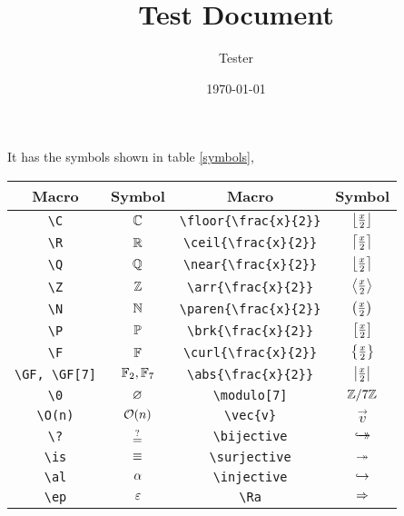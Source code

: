 \documentclass{article}
\title{Test Document}
\author{Tester}
\date{\today}
\newcommand{\bk}{\textbackslash}
\newcommand{\dummy}[1]{\texttt{\bk #1\{\bk frac\{x\}\{2\}\}}}
\begin{document}
 \maketitle
It has the symbols shown in table \ref{symbols},
\begin{table}[hbtp]%
  \centering%
  \begin{tabular}{||c | c | c | c ||} \hline
    Macro                      & Symbol       & Macro                               & Symbol                \\ \hline
    \texttt{\bk C}             & $\C$         & \dummy{floor}                       & $\floor{\frac{x}{2}}$ \\ \hline
    \texttt{\bk R}             & $\R$         & \dummy{ceil}                        & $\ceil{\frac{x}{2}}$  \\ \hline
    \texttt{\bk Q}             & $\Q$         & \dummy{near}                        & $\near{\frac{x}{2}}$  \\ \hline
    \texttt{\bk Z}             & $\Z$         & \dummy{arr}                         & $\arr{\frac{x}{2}}$   \\ \hline
    \texttt{\bk N}             & $\N$         & \dummy{paren}                       & $\paren{\frac{x}{2}}$ \\ \hline
    \texttt{\bk P}             & $\P$         & \dummy{brk}                         & $\brk{\frac{x}{2}}$   \\ \hline
    \texttt{\bk F}             & $\F$         & \dummy{curl}                        & $\curl{\frac{x}{2}}$  \\ \hline
    \texttt{\bk GF, \bk GF[7]} & $\GF,\GF[7]$ & \dummy{abs}                         & $\abs{\frac{x}{2}}$   \\ \hline
    \texttt{\bk 0}             & $\nil$       & \texttt{\bk modulo[7]}              & $\modulo[7]$          \\ \hline
    \texttt{\bk O(n)}          & $\O(n)$      & \texttt{\bk vec\{v\}}               & $\vec{v}$             \\ \hline
    \texttt{\bk ?}             & $\?$         & \texttt{\bk bijective}              & $\bijective$          \\ \hline
    \texttt{\bk is}            & $\is$        & \texttt{\bk surjective}             & $\surjective$         \\ \hline
    \texttt{\bk al}            & $\al$        & \texttt{\bk injective}              & $\injective$          \\ \hline
    \texttt{\bk ep}            & $\ep$        & \texttt{\bk Ra}                     & $\Ra$                 \\ \hline

\end{tabular}
\end{table}
\end{document}
